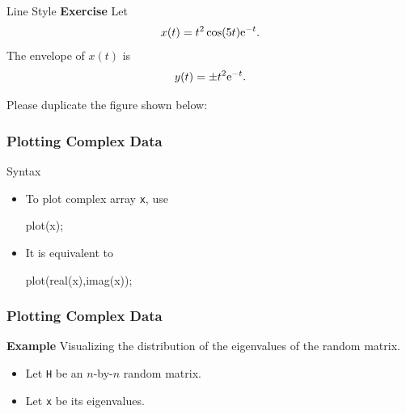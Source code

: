 \documentclass[compress]{beamer}  %
\begin{document}
\begin{frame}{Line Style}
\textbf{Exercise}
Let
\begin{equation}
    x(t) = t^2 \cos(5t) \textrm{e}^{-t}.
\end{equation}\pause
The envelope of $x(t)$ is
\begin{equation}
    y(t) = \pm t^2 \textrm{e}^{-t}.
\end{equation}\pause

Please duplicate the figure shown below:
\begin{figure}[htb]
        \centering
\end{figure}

\end{frame}
\begin{frame}[fragile]
\frametitle{Plotting Complex Data}

\begin{block}{Syntax}
\begin{itemize}[<+->]
    \item To plot complex array \texttt{x}, use
          \begin{matlabcodebeamer}[frame=none]
          plot(x);
          \end{matlabcodebeamer}
    \item It is equivalent to
          \begin{matlabcodebeamer}[frame=none]
          plot(real(x),imag(x));
          \end{matlabcodebeamer}
\end{itemize}
\end{block}

\end{frame}
\begin{frame}[fragile]
\frametitle{Plotting Complex Data}
\textbf{Example} 
Visualizing the distribution of the eigenvalues of the random matrix. \pause
\begin{itemize}
    \item Let \texttt{H} be an $n$-by-$n$ random matrix.
    \item Let \texttt{x} be its eigenvalues.
\end{itemize}

\pause
\begin{figure}[htb]
        \centering
\end{figure}

\end{frame}
\end{document}
